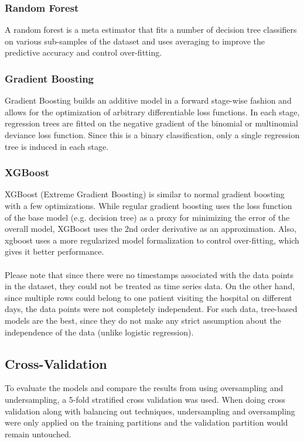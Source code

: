 \documentclass[letterpaper, 10 pt, conference]{ieeeconf}  %
\begin{document}
\subsubsection{Random Forest}
A random forest is a meta estimator that fits a number of decision tree classifiers on various sub-samples of the dataset and uses averaging to improve the predictive accuracy and control over-fitting.

\subsubsection{Gradient Boosting}
Gradient Boosting builds an additive model in a forward stage-wise fashion and allows for the optimization of arbitrary differentiable loss functions. In each stage, regression trees are fitted on the negative gradient of the binomial or multinomial deviance loss function. Since this is a binary classification, only a single regression tree is induced in each stage.

\subsubsection{XGBoost} 
XGBoost (Extreme Gradient Boosting) is similar to normal gradient boosting with a few optimizations. While regular gradient boosting uses the loss function of the base model (e.g. decision tree) as a proxy for minimizing the error of the overall model, XGBoost uses the 2nd order derivative as an approximation. Also, xgboost uses a more regularized model formalization to control over-fitting, which gives it better performance.\\\\

Please note that since there were no timestamps associated with the data points in the dataset, they could not be treated as time series data. On the other hand, since multiple rows could belong to one patient visiting the hospital on different days, the data points were not completely independent. For such data, tree-based models are the best, since they do not make any strict assumption about the independence of the data (unlike logistic regression).

\subsection{Cross-Validation}
To evaluate the models and compare the results from using oversampling and undersampling, a 5-fold stratified cross validation was used. When doing cross validation along with balancing out techniques, undersampling and oversampling were only applied on the training partitions and the validation partition would remain untouched.
\end{document}
